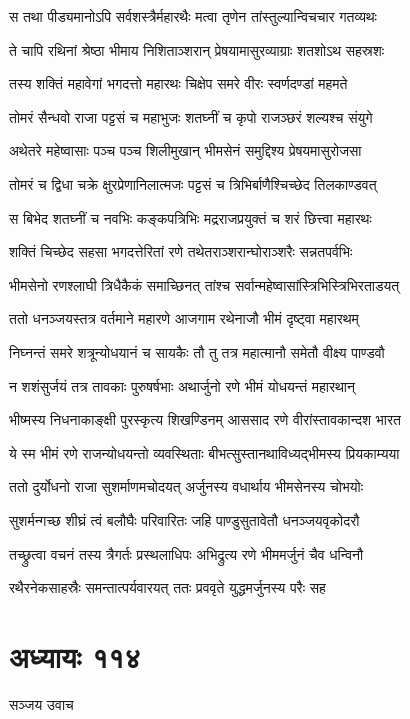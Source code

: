 \twolineshloka
{स तथा पीड्यमानोऽपि सर्वशस्त्रैर्महारथैः}
{मत्वा तृणेन तांस्तुल्यान्विचचार गतव्यथः}


\twolineshloka
{ते चापि रथिनां श्रेष्ठा भीमाय निशिताञ्शरान्}
{प्रेषयामासुरव्याग्राः शतशोऽथ सहस्रशः}


\twolineshloka
{तस्य शक्तिं महावेगां भगदत्तो महारथः}
{चिक्षेप समरे वीरः स्वर्णदण्डां महमते}


\twolineshloka
{तोमरं सैन्धवो राजा पट्टसं च महाभुजः}
{शतघ्नीं च कृपो राजञ्छरं शल्यश्च संयुगे}


\twolineshloka
{अथेतरे महेष्वासाः पञ्च पञ्च शिलीमुखान्}
{भीमसेनं समुद्दिश्य प्रेषयमासुरोजसा}


\twolineshloka
{तोमरं च द्विधा चक्रे क्षुरप्रेणानिलात्मजः}
{पट्टसं च त्रिभिर्बाणैश्चिच्छेद तिलकाण्डवत्}


\twolineshloka
{स बिभेद शतघ्नीं च नवभिः कङ्कपत्रिभिः}
{मद्रराजप्रयुक्तं च शरं छित्त्वा महारथः}


\twolineshloka
{शक्तिं चिच्छेद सहसा भगदत्तेरितां रणे}
{तथेतराञ्शरान्घोराञ्शरैः सन्नतपर्वभिः}


\twolineshloka
{भीमसेनो रणश्लाघी त्रिधैकैकं समाच्छिनत्}
{तांश्च सर्वान्महेष्वासांस्त्रिभिस्त्रिभिरताडयत्}


\twolineshloka
{ततो धनञ्जयस्तत्र वर्तमाने महारणे}
{आजगाम रथेनाजौ भीमं दृष्ट्वा महारथम्}


\twolineshloka
{निघ्नन्तं समरे शत्रून्योधयानं च सायकैः}
{तौ तु तत्र महात्मानौ समेतौ वीक्ष्य पाण्डवौ}


\twolineshloka
{न शशंसुर्जयं तत्र तावकाः पुरुषर्षभाः}
{अथार्जुनो रणे भीमं योधयन्तं महारथान्}


\twolineshloka
{भीष्मस्य निधनाकाङ्क्षी पुरस्कृत्य शिखण्डिनम्}
{आससाद रणे वीरांस्तावकान्दश भारत}


\twolineshloka
{ये स्म भीमं रणे राजन्योधयन्तो व्यवस्थिताः}
{बीभत्सुस्तानथाविध्यद्भीमस्य प्रियकाम्यया}


\twolineshloka
{ततो दुर्योधनो राजा सुशर्माणमचोदयत्}
{अर्जुनस्य वधार्थाय भीमसेनस्य चोभयोः}


\twolineshloka
{सुशर्मन्गच्छ शीघ्रं त्वं बलौघैः परिवारितः}
{जहि पाण्डुसुतावेतौ धनञ्जयवृकोदरौ}


\twolineshloka
{तच्छ्रुत्वा वचनं तस्य त्रैगर्तः प्रस्थलाधिपः}
{अभिद्रुत्य रणे भीममर्जुनं चैव धन्विनौ}


\twolineshloka
{रथैरनेकसाहस्रैः समन्तात्पर्यवारयत्}
{ततः प्रववृते युद्धमर्जुनस्य परैः सह}


\chapter{अध्यायः ११४}
\twolineshloka
{सञ्जय उवाच}
{}


